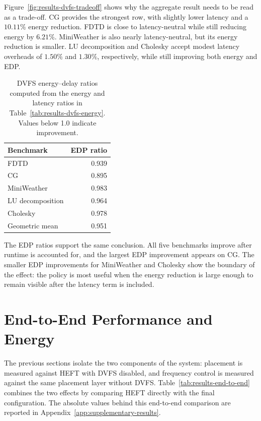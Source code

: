 Figure~\ref{fig:results-dvfs-tradeoff} shows why the aggregate result needs to
be read as a trade-off. CG provides the strongest row, with slightly lower
latency and a \(10.11\%\) energy reduction. FDTD is close to latency-neutral
while still reducing energy by \(6.21\%\). MiniWeather is also nearly
latency-neutral, but its energy reduction is smaller. LU decomposition and
Cholesky accept modest latency overheads of \(1.50\%\) and \(1.30\%\),
respectively, while still improving both energy and EDP.

\begin{table}[!htbp]
\centering
\footnotesize
\begin{tabular}{@{}lr@{}}
\toprule
Benchmark & EDP ratio \\
\midrule
FDTD & 0.939 \\
CG & 0.895 \\
MiniWeather & 0.983 \\
LU decomposition & 0.964 \\
Cholesky & 0.978 \\
\midrule
Geometric mean & 0.951 \\
\bottomrule
\end{tabular}
\caption{DVFS energy--delay ratios computed from the energy and latency ratios in Table~\ref{tab:results-dvfs-energy}. Values below 1.0 indicate improvement.}
\label{tab:results-dvfs-edp}
\end{table}

\figDvfsEdpRatios

The EDP ratios support the same conclusion. All five benchmarks improve after
runtime is accounted for, and the largest EDP improvement appears on CG. The
smaller EDP improvements for MiniWeather and Cholesky show the boundary of the
effect: the policy is most useful when the energy reduction is large enough to
remain visible after the latency term is included.

\section{End-to-End Performance and Energy}
\label{sec:results-end-to-end}

The previous sections isolate the two components of the system: placement is
measured against HEFT with DVFS disabled, and frequency control is measured
against the same placement layer without DVFS. Table~\ref{tab:results-end-to-end}
combines the two effects by comparing HEFT directly with the final
\BanditWinDVFS{} configuration. The absolute values behind this end-to-end
comparison are reported in Appendix~\ref{app:supplementary-results}.

